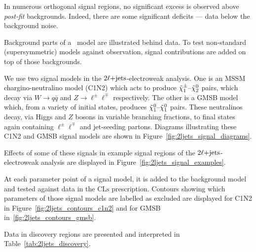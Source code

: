 In numerous orthogonal signal regions, no significant excess is observed
above \emph{post-fit} backgrounds.
Indeed, there are some significant deficits --- data below the background noise.

Background parts of a \heplikelihood\ model are illustrated behind data.
To test non-standard (supersymmetric) models against observation, signal
contributions are added on top of those backgrounds.

We use two signal models in the $2\ell\mathrm{+jets}$-electroweak analysis.
One is an MSSM chargino-neutralino model (C1N2) which acts to produce
$\tilde\chi^\pm_1\textrm{--}\tilde\chi^0_2$ pairs, which decay via
$W\rightarrow q\bar q$ and
$Z\rightarrow \ell^\pm \ell^\mp$ respectively.
The other is a GMSB model which, from a variety of initial states, produces
$\tilde\chi^0_1\textrm{--}\tilde\chi^0_1$ pairs.
These neutralinos decay,
via Higgs and $Z$ bosons in variable branching fractions,
to final states again containing $\ell^\pm \ell^\mp$ and jet-seeding partons.
Diagrams illustrating these C1N2 and GMSB signal models are shown in
Figure~\ref{fig:2ljets_signal_diagrams}.

Effects of some of these signals in example signal regions of the
$2\ell\mathrm{+jets}$-electroweak analysis are displayed in
Figure~\ref{fig:2ljets_signal_examples}.

At each parameter point of a signal model, it is added to the background model
and tested against data in the $\mathrm{CLs}$ prescription.
Contours showing which parameters of those signal models are labelled as
excluded are displayed for
C1N2 in Figure~\ref{fig:2ljets_contours_c1n2} and for
GMSB in~\ref{fig:2ljets_contours_gmsb}.

Data in discovery regions are presented and interpreted in
Table~\ref{tab:2ljets_discovery}.




